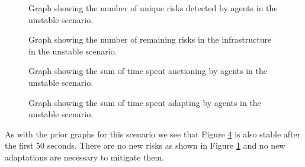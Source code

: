 \begin{figure}[H]
    \centering
        
    \caption{Graph showing the number of unique risks detected by agents in the unstable scenario.}
    \label{fig:risk-count-unstable}
\end{figure}

\begin{figure}[H]
    \centering
        
    \caption{Graph showing the number of remaining risks in the infrastructure in the unstable scenario.}
    \label{fig:risk-remaining-unstable}
\end{figure}


\begin{figure}[H]
    \hspace*{-1cm}
    \centering
        
    \caption{Graph showing the sum of time spent auctioning by agents in the unstable scenario.}
    \label{fig:auctioning-time-unstable}
\end{figure}

\begin{figure}[H]
    \hspace*{-1cm}
    \centering
        
    \caption{Graph showing the sum of time spent adapting by agents in the unstable scenario.}
    \label{fig:adapting-time-unstable}
\end{figure}

As with the prior graphs for this scenario we see that Figure \ref{fig:adapting-time-unstable} is also stable after the first $50$ seconds. There are no new risks as shown in Figure \ref{fig:risk-count-unstable} and no new adaptations are necessary to mitigate them. 
